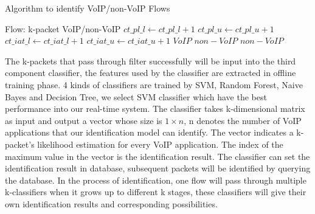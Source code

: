 \documentclass[conference]{IEEEtran}
\begin{document}
\renewcommand{\algorithmicrequire}{\textbf{Input:}}
\renewcommand{\algorithmicensure}{\textbf{Output:}}

\begin{algorithm}[!h]
\caption{Algorithm to identify VoIP/non-VoIP Flows}
\label{algorithm:filter}
\begin{algorithmic}[1]
\REQUIRE Flow: k-packet
\ENSURE VoIP/non-VoIP
       	\STATE $ct\_pl\_l \gets ct\_pl\_l +1$
       \ENDIF
       	\STATE $ct\_pl\_u \gets ct\_pl\_u+1$
       \ENDIF
       	\STATE $ct\_iat\_l  \gets ct\_iat\_l+1$
       \ENDIF
       	\STATE $ct\_iat\_u \gets ct\_iat\_u+1$
       \ENDIF
    \ENDFOR
        \RETURN $VoIP$
    \ELSE  \RETURN $non-VoIP$
   \ENDIF
\ELSE \RETURN $non-VoIP$
\ENDIF
\end{algorithmic}
\end{algorithm}

The k-packets that pass through filter successfully will be input into the third component classifier, the features used by the classifier are extracted in offline training phase. 4 kinds of classifiers are trained by SVM, Random Forest, Naive Bayes and Decision Tree, we select SVM classifier which have the best performance into our real-time system. The classifier takes k-dimensional matrix as input and output a vector whose size is $1 \times n$,  n denotes the number of VoIP applications that our identification model can identify. The vector indicates a k-packet's likelihood estimation for every VoIP application. The index of the maximum value in the vector is the identification result. The classifier can set the identification result in database, subsequent packets will be identified by querying the database. In the process of identification, one flow will pass through multiple k-classifiers when it grows up to different k stages, these classifiers will give their own identification results and corresponding possibilities. 
\end{document}
